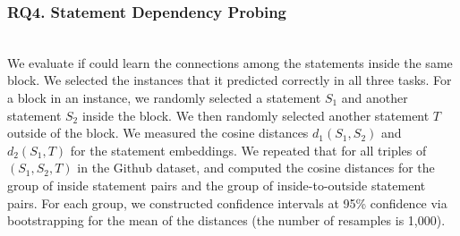 \subsubsection{RQ4. Statement Dependency Probing}~\\
We evaluate if {\tool} could learn the connections
among the statements inside the same  block. We
selected the instances that it predicted correctly in all three
tasks. For a  block in an instance, we randomly
selected a statement $S_1$ and another statement $S_2$ inside the
block. We then randomly selected another statement $T$ outside of the
block. We measured the cosine distances $d_1(S_1,S_2)$ and $d_2(S_1,T)$
for the statement embeddings. We repeated that for all triples
of $(S_1,S_2,T)$ in the Github dataset, and computed the cosine
distances for the group of inside statement pairs and the group of
inside-to-outside statement pairs. For each group, we constructed
confidence intervals at 95\% confidence via bootstrapping for the mean
of the distances (the number of resamples is 1,000).




 

